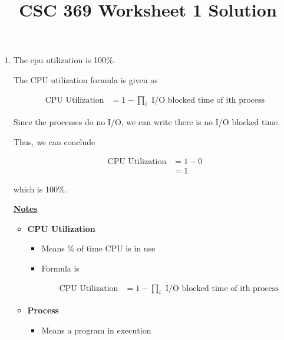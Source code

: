 \documentclass[12pt]{article}
\begin{document}
\title{CSC 369 Worksheet 1 Solution}

\maketitle

\bigskip

\begin{enumerate}[1.]
    \item

    \bigskip

    The cpu utilization is 100\%.

    \bigskip

    The CPU utilization formula is given as

    \begin{align}
        \text{CPU Utilization} &= 1 - \prod\limits_{i} \text{ I/O blocked time of ith process}
    \end{align}

    \bigskip

    Since the processes do no I/O, we can write there is no I/O blocked time.

    \bigskip

    Thus, we can conclude


    \begin{align}
        \text{CPU Utilization} &= 1 - 0\\
        &= 1
    \end{align}

    which is 100\%.

    \bigskip

    \underline{\textbf{Notes}}

    \begin{itemize}
        \item \textbf{CPU Utilization}

        \begin{itemize}
            \item Means \% of time CPU is in use
            \item Formula is

            \begin{align}
                \text{CPU Utilization} &= 1 - \prod\limits_{i} \text{ I/O blocked time of ith process}
            \end{align}
        \end{itemize}
        \item \textbf{Process}

        \begin{itemize}
            \item Means a program in execution
        \end{itemize}


\end{itemize}
\end{enumerate}
\end{document}
